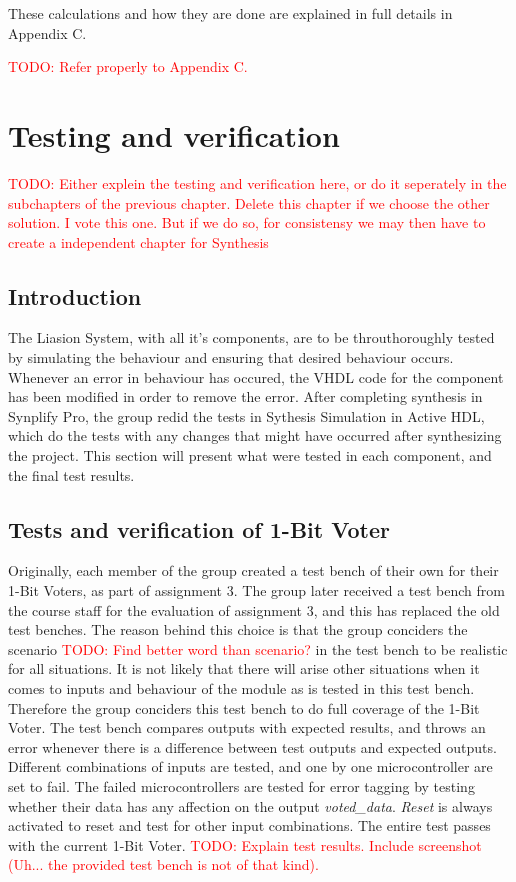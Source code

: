 \documentclass[a4paper]{IEEEtran}
\newcommand\TODO[1]{\textcolor{red}{TODO:#1}}
\newcommand\todo[1]{\TODO{#1}}
\begin{document}
These calculations and how they are done are explained in full details in Appendix C.

\todo{ Refer properly to Appendix C.}

\section{ Testing and verification }
\todo{ Either explein the testing and verification here, or do it seperately in the subchapters of the previous chapter. Delete this chapter if we choose the other solution. I vote this one. But if we do so, for consistensy we may then have to create a independent chapter for Synthesis }
\subsection{ Introduction}
The Liasion System, with all it's components, are to be throuthoroughly tested by simulating the behaviour and ensuring that desired behaviour occurs.
Whenever an error in behaviour has occured, the VHDL code for the component has been modified in order to remove the error.
After completing synthesis in Synplify Pro, the group redid the tests in Sythesis Simulation in Active HDL, which do the tests with any changes that might have occurred after synthesizing the project. 
This section will present what were tested in each component, and the final test results.

\subsection{ Tests and verification of 1-Bit Voter}
Originally, each member of the group created a test bench of their own for their 1-Bit Voters, as part of assignment 3.
The group later received a test bench from the course staff for the evaluation of assignment 3, and this has replaced the old test benches.
The reason behind this choice is that the group conciders the scenario \todo{ Find better word than scenario?} in the test bench to be realistic for all situations.
It is not likely that there will arise other situations when it comes to inputs and behaviour of the module as is tested in this test bench.
Therefore the group conciders this test bench to do full coverage of the 1-Bit Voter.
The test bench compares outputs with expected results, and throws an error whenever there is a difference between test outputs and expected outputs.
Different combinations of inputs are tested, and one by one microcontroller are set to fail.
The failed microcontrollers are tested for error tagging by testing whether their data has any affection on the output \textit{voted\_data}.
\textit{Reset} is always activated to reset and test for other input combinations.
The entire test passes with the current 1-Bit Voter. 
\todo{ Explain test results. Include screenshot (Uh... the provided test bench is not of that kind).}
\end{document}
